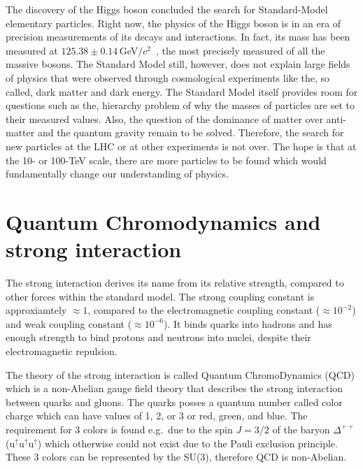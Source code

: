 The discovery of the Higgs boson concluded the search for Standard-Model elementary particles. Right now, the physics of the Higgs boson is in an era of precision measurements of its decays and interactions. In fact, its mass has been measured at $125.38\pm0.14\,$GeV$/c^2$~\cite{HiggsMass}, the most precisely measured of all the massive bosons. The Standard Model still, however, does not explain large fields of physics that were observed through cosmological experiments like the, so called, dark matter and dark energy. The Standard Model itself provides room for questions such as the, hierarchy problem of why the masses of particles are set to their measured values. Also, the question of the dominance of matter over anti-matter and the quantum gravity remain to be solved. Therefore, the search for  new particles at the LHC or at other experiments is not over. The hope is that at the 10- or 100-TeV scale, there are more particles to be found which would fundamentally change our understanding of physics. 





\section{\label{QCD}Quantum Chromodynamics and strong interaction}
The strong interaction derives its name from its relative strength, compared to other forces within the standard model. The strong coupling constant is approxiamtely $\approx 1$, compared to the electromagnetic coupling constant ($\approx 10^{-2}$) and weak coupling constant ($\approx 10^{-6}$)\@. It binds quarks into hadrons and has enough strength to bind protons and neutrons into nuclei, despite their electromagnetic repulsion.

The theory of the strong interaction is called Quantum ChromoDynamics (QCD) which is a non-Abelian gauge field theory that describes the strong interaction between quarks and gluons. The quarks posses a quantum number called color charge which can have values of 1, 2, or 3 or red, green, and blue. The requirement for 3 colors is found e.g.\ due to the spin $J = 3/2$ of the baryon $\Delta^{++}$ (u$^\uparrow$u$^\uparrow$u$^\uparrow$) which otherwise could not exist due to the Pauli exclusion principle. These 3 colors can be represented by the SU(3), therefore QCD is non-Abelian.

